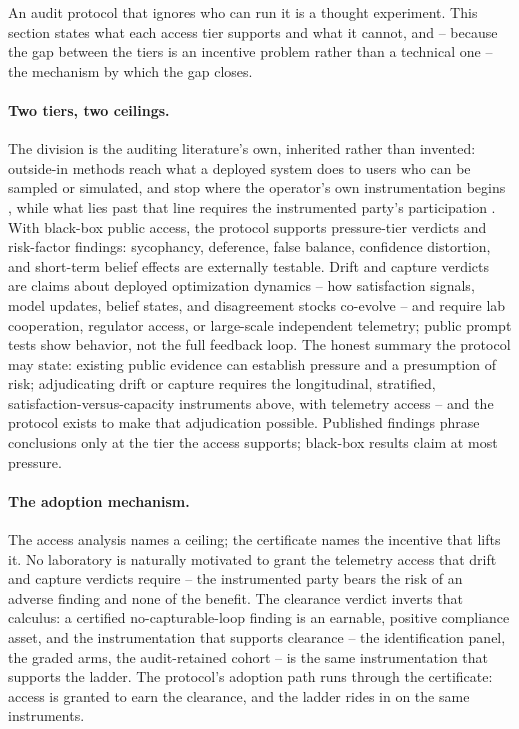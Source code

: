 \documentclass[11pt]{article}
\theoremstyle{definition}
\theoremstyle{remark}
\numberwithin{equation}{section}
\begin{document}
An audit protocol that ignores who can run it is a thought experiment. This section states what each access tier supports and what it cannot, and -- because the gap between the tiers is an incentive problem rather than a technical one -- the mechanism by which the gap closes.

\paragraph{Two tiers, two ceilings.} The division is the auditing literature's own, inherited rather than invented: outside-in methods reach what a deployed system does to users who can be sampled or simulated, and stop where the operator's own instrumentation begins \citep{metaxa2021auditing}, while what lies past that line requires the instrumented party's participation \citep{raji2020closing}. With black-box public access, the protocol supports pressure-tier verdicts and risk-factor findings: sycophancy, deference, false balance, confidence distortion, and short-term belief effects are externally testable. Drift and capture verdicts are claims about deployed optimization dynamics -- how satisfaction signals, model updates, belief states, and disagreement stocks co-evolve -- and require lab cooperation, regulator access, or large-scale independent telemetry; public prompt tests show behavior, not the full feedback loop. The honest summary the protocol may state: existing public evidence can establish pressure and a presumption of risk; adjudicating drift or capture requires the longitudinal, stratified, satisfaction-versus-capacity instruments above, with telemetry access -- and the protocol exists to make that adjudication possible. Published findings phrase conclusions only at the tier the access supports; black-box results claim at most pressure.

\paragraph{The adoption mechanism.} The access analysis names a ceiling; the certificate names the incentive that lifts it. No laboratory is naturally motivated to grant the telemetry access that drift and capture verdicts require -- the instrumented party bears the risk of an adverse finding and none of the benefit. The clearance verdict inverts that calculus: a certified no-capturable-loop finding is an earnable, positive compliance asset, and the instrumentation that supports clearance -- the identification panel, the graded arms, the audit-retained cohort -- is the same instrumentation that supports the ladder. The protocol's adoption path runs through the certificate: access is granted to earn the clearance, and the ladder rides in on the same instruments.
\end{document}
